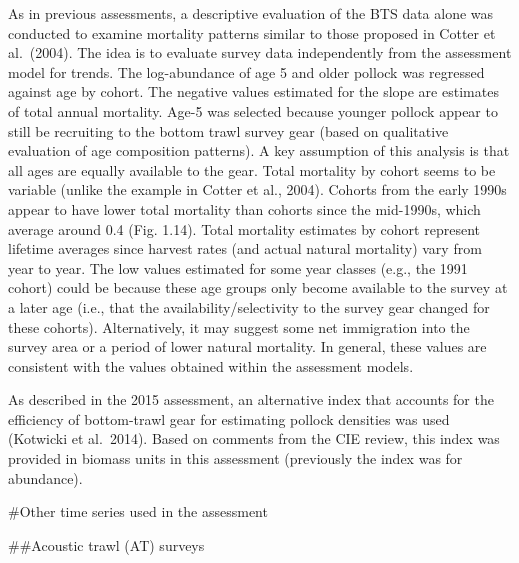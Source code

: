 As in previous assessments, a descriptive evaluation of the BTS data
alone was conducted to examine mortality patterns similar to those
proposed in Cotter et al.~(2004). The idea is to evaluate survey data
independently from the assessment model for trends. The log-abundance of
age 5 and older pollock was regressed against age by cohort. The
negative values estimated for the slope are estimates of total annual
mortality. Age-5 was selected because younger pollock appear to still be
recruiting to the bottom trawl survey gear (based on qualitative
evaluation of age composition patterns). A key assumption of this
analysis is that all ages are equally available to the gear. Total
mortality by cohort seems to be variable (unlike the example in Cotter
et al., 2004). Cohorts from the early 1990s appear to have lower total
mortality than cohorts since the mid-1990s, which average around 0.4
(Fig. 1.14). Total mortality estimates by cohort represent lifetime
averages since harvest rates (and actual natural mortality) vary from
year to year. The low values estimated for some year classes (e.g., the
1991 cohort) could be because these age groups only become available to
the survey at a later age (i.e., that the availability/selectivity to
the survey gear changed for these cohorts). Alternatively, it may
suggest some net immigration into the survey area or a period of lower
natural mortality. In general, these values are consistent with the
values obtained within the assessment models.

As described in the 2015 assessment, an alternative index that accounts
for the efficiency of bottom-trawl gear for estimating pollock densities
was used (Kotwicki et al.~2014). Based on comments from the CIE review,
this index was provided in biomass units in this assessment (previously
the index was for abundance).

\#Other time series used in the assessment

\#\#Acoustic trawl (AT) surveys

